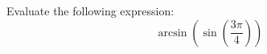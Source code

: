 \documentclass{ximera}
\author{David Kish}
\begin{document}
\begin{exercise}
Evaluate the following expression:
\[
\arcsin(\sin(\frac{3\pi}{4}))
\]
\begin{multipleChoice}
\end{multipleChoice}
\end{exercise}
\end{document}
